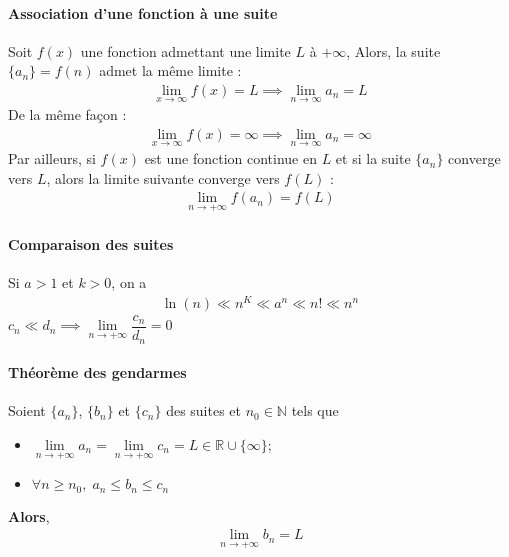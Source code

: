 \documentclass[2pt]{report}
\begin{document}
\begin{multicols*}{3}
    \paragraph{Association d'une fonction à une suite}
        Soit $f\left(x\right)$ une fonction admettant une limite $L$ à 
        $\text{+}\infty$, Alors, la suite 
        $\{a_n\} = f\left(n\right)$ admet la même limite : 
        \begin{align*}
          \lim\limits_{x\to\infty  }f(x) = L \implies \lim\limits_{n\to\infty  }a_n = L
        \end{align*}
        De la même façon :
        \begin{align*}
          \lim\limits_{x\to\infty  }f(x) = \infty \implies \lim\limits_{n\to\infty  }a_n = \infty
        \end{align*}
        Par ailleurs, si $f\left(x\right)$ est une fonction continue en 
        $L$ et si la suite $\{a_n\}$
        converge vers $L$, alors la limite suivante converge vers $f\left(L\right)$ :
        \begin{align*}
                    \lim\limits_{n\to+\infty  }f(a_n)  = f(L) 
        \end{align*}



    \paragraph{Comparaison des suites}
        Si $a > 1$ et $k > 0$, on a 
        \begin{align*}
            \ln(n) \ll n^K \ll a^n \ll n! \ll n^n
        \end{align*}
        $c_n \ll d_n \implies 
        \lim\limits_{n\to+\infty }\dfrac{c_n}{d_n} = 0$ 


    \paragraph{Théorème des gendarmes}{}
        Soient $\{a_n\}$, $\{b_n\}$ et $\{c_n\}$ des suites et $n_0 \in \mathbb{N}$ tels 
        que
        \begin{itemize}
            \item $\lim\limits_{n\to+\infty }a_n  = 
                \lim\limits_{n\to+\infty }c_n  = L 
                \in \mathbb{R} \cup \{\infty \}$; 
            \item $\forall n \geq n_0, \; a_n \leq b_n \leq c_n$ 
        \end{itemize}
        \textbf{Alors},
        \begin{align*}
            \lim\limits_{n\to+\infty}b_n  = L                   
        \end{align*}




\end{multicols*}
\end{document}
